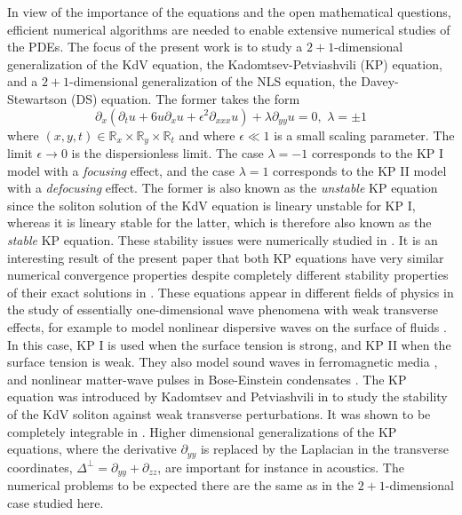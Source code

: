\documentclass[final]{siamltex}
\begin{document}
In view of the importance of the equations and the open mathematical 
questions, efficient numerical algorithms are needed to enable 
extensive numerical studies of the PDEs. The focus of the present work 
is to study a $2+1$-dimensional generalization of the KdV equation, the 
Kadomtsev-Petviashvili (KP) equation, and a $2+1$-dimensional 
generalization of the NLS equation, the Davey-Stewartson  (DS) equation. 
The former takes the form
\begin{equation}\label{e1}
\partial_{x}\left(\partial_{t}u+6u\partial_{x}u+\epsilon^{2}\partial_{xxx}u\right)+\lambda\partial_{yy}u=0,\,\,\lambda=\pm1
\end{equation}
where $(x,y,t)\in\mathbb{R}_{x}\times\mathbb{R}_{y}\times\mathbb{R}_{t}$
and where $\epsilon\ll1$ is a small scaling parameter. The limit 
$\epsilon\to0$ is the dispersionless limit. 
The case $\lambda=-1$ corresponds to the KP I model with a 
\emph{focusing} effect, and the case $\lambda=1$
corresponds to the KP II model with a \emph{defocusing} effect. The former is also known as 
the \emph{unstable} KP equation since the soliton solution of the KdV equation 
is lineary unstable for KP I, whereas it is lineary stable for the latter, which 
is therefore also known as the \emph{stable} KP equation. These 
stability issues were numerically studied in \cite{KS10}. It is 
an interesting result of the present paper that both KP equations 
have very similar numerical convergence properties despite completely 
different stability properties of their exact solutions in \cite{KS10}.
These equations appear in different fields of physics in
the study of
essentially one-dimensional wave phenomena with weak transverse effects, for example to model nonlinear dispersive
waves on the surface of fluids \cite{KP}. In this case, KP I is used when the surface tension is strong, and
KP II when the surface tension is weak. 
They also model sound waves in ferromagnetic media \cite{KPfer}, and nonlinear matter-wave pulses in
Bose-Einstein condensates \cite{KPbose}. The KP 
equation was introduced by Kadomtsev and Petviashvili in \cite{KP} to 
study the stability of the KdV soliton against weak transverse 
perturbations. It was shown to be completely integrable in 
\cite{Dry}. Higher dimensional generalizations of the KP equations, 
where the derivative $\partial_{yy}$ is replaced by the Laplacian 
in the transverse coordinates, 
$\Delta^{\perp}=\partial_{yy}+\partial_{zz}$, 
are important for instance in acoustics. The numerical problems to be 
expected there are the same as in the $2+1$-dimensional case studied 
here. 
  
\end{document}
